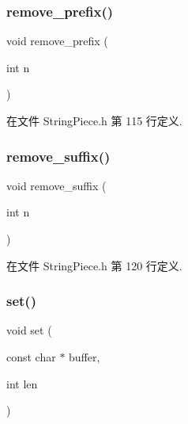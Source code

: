 \subsubsection{\texorpdfstring{remove\+\_\+prefix()}{remove\_prefix()}}
{\footnotesize\ttfamily void remove\+\_\+prefix (\begin{DoxyParamCaption}\item[{int}]{n }\end{DoxyParamCaption})\hspace{0.3cm}{\ttfamily [inline]}}



在文件 String\+Piece.\+h 第 115 行定义.

\mbox{\label{classmuduo_1_1StringPiece_a63be252f1ef4e181e3f878ed0c178311}} 
\subsubsection{\texorpdfstring{remove\+\_\+suffix()}{remove\_suffix()}}
{\footnotesize\ttfamily void remove\+\_\+suffix (\begin{DoxyParamCaption}\item[{int}]{n }\end{DoxyParamCaption})\hspace{0.3cm}{\ttfamily [inline]}}



在文件 String\+Piece.\+h 第 120 行定义.

\mbox{\label{classmuduo_1_1StringPiece_a1f0ee9dccfd3553dffa874b3bc701fb3}} 
\subsubsection{\texorpdfstring{set()}{set()}\hspace{0.1cm}{\footnotesize\ttfamily [1/3]}}
{\footnotesize\ttfamily void set (\begin{DoxyParamCaption}\item[{const char $\ast$}]{buffer,  }\item[{int}]{len }\end{DoxyParamCaption})\hspace{0.3cm}{\ttfamily [inline]}}



